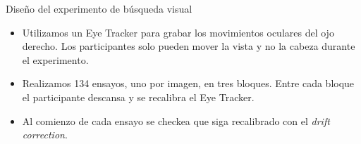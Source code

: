 \documentclass[compress]{beamer}
\begin{document}
\begin{frame}{Diseño del experimento de búsqueda visual}

\begin{itemize}
\item Utilizamos un Eye Tracker para grabar los movimientos oculares del ojo derecho. Los participantes solo pueden mover la vista y no la cabeza durante el experimento.
\item Realizamos 134 ensayos, uno por imagen, en tres bloques. Entre cada bloque el participante descansa y se recalibra el Eye Tracker.
\item Al comienzo de cada ensayo se checkea que siga recalibrado con el \textit{drift correction}.
\end{itemize}

\end{frame}
\end{document}
